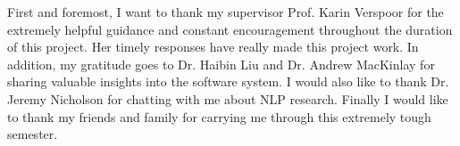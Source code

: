 
\begin{acknowledgements}      
First and foremost, I want to thank my supervisor Prof. Karin Verspoor for the extremely helpful guidance and constant encouragement throughout the duration of this project. Her timely responses have really made this project work. In addition, my gratitude goes to Dr. Haibin Liu and Dr. Andrew MacKinlay for sharing valuable insights into the software system. I would also like to thank Dr. Jeremy Nicholson for chatting with me about NLP research. Finally I would like to thank my friends and family for carrying me through this extremely tough semester.
\end{acknowledgements}
